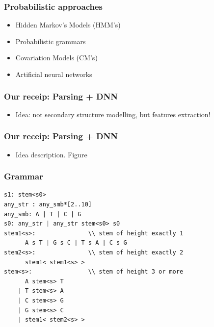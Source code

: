 \documentclass[xcolor=table]{beamer}
\begin{document}
\begin{frame} \frametitle{Probabilistic approaches}

\begin{itemize}
  \item Hidden Markov's Models (HMM's)
  \item Probabilistic grammars
  \item Covariation Models (CM's)
  \item Artificial neural networks
\end{itemize}

\end{frame}


\begin{frame} \frametitle{Our receip: Parsing + DNN}

\begin{itemize}
  \item Idea: not secondary structure modelling, but features extraction!
\end{itemize}

\end{frame}


\begin{frame} \frametitle{Our receip: Parsing + DNN}

\begin{itemize}
  \item Idea description. Figure
\end{itemize}

\end{frame}

\begin{frame}[fragile] \frametitle{Grammar}
\begin{verbatim}
s1: stem<s0>
any_str : any_smb*[2..10]
any_smb: A | T | C | G
s0: any_str | any_str stem<s0> s0
stem1<s>:               \\ stem of height exactly 1
      A s T | G s C | T s A | C s G
stem2<s>:               \\ stem of height exactly 2
      stem1< stem1<s> >
stem<s>:                \\ stem of height 3 or more
      A stem<s> T
    | T stem<s> A
    | C stem<s> G
    | G stem<s> C
    | stem1< stem2<s> >
\end{verbatim}
\pause
{}
\end{frame}
\end{document}
